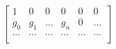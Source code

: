 \documentclass[preview]{standalone}
\begin{document}
\begin{align*}
\begin{bmatrix}1 & 0 & 0 & 0 & 0 & 0 \\g_0 & g_1 & \ldots & g_n & 0 & \ldots \\\cdots & \cdots & \cdots & \cdots & \cdots & \cdots \\\end{bmatrix}
\end{align*}
\end{document}
